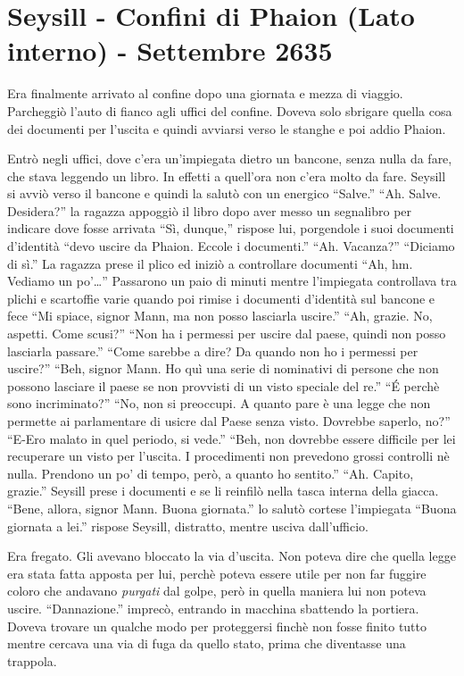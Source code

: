   \section{Seysill - Confini di Phaion (Lato interno) - Settembre 2635}

    Era finalmente arrivato al confine dopo una giornata e mezza di
    viaggio. Parcheggiò l'auto di fianco agli uffici del confine. Doveva
    solo sbrigare quella cosa dei documenti per l'uscita e quindi avviarsi
    verso le stanghe e poi addio Phaion.

    Entrò negli uffici, dove c'era un'impiegata dietro un bancone, senza
    nulla da fare, che stava leggendo un libro. In effetti a quell'ora non
    c'era molto da fare. Seysill si avviò verso il bancone e quindi la
    salutò con un energico ``Salve.'' ``Ah. Salve. Desidera?'' la ragazza
    appoggiò il libro dopo aver messo un segnalibro per indicare dove fosse
    arrivata ``Sì, dunque,'' rispose lui, porgendole i suoi documenti
    d'identità ``devo uscire da Phaion. Eccole i documenti.'' ``Ah.
    Vacanza?'' ``Diciamo di sì.'' La ragazza prese il plico ed iniziò a
    controllare documenti ``Ah, hm. Vediamo un po'\dots{}'' Passarono un
    paio di minuti mentre l'impiegata controllava tra plichi e scartoffie
    varie quando poi rimise i documenti d'identità sul bancone e fece ``Mi
    spiace, signor Mann, ma non posso lasciarla uscire.'' ``Ah, grazie. No,
    aspetti. Come scusi?'' ``Non ha i permessi per uscire dal paese, quindi
    non posso lasciarla passare.'' ``Come sarebbe a dire? Da quando non ho
    i permessi per uscire?'' ``Beh, signor Mann. Ho quì una serie di
    nominativi di persone che non possono lasciare il paese se non
    provvisti di un visto speciale del re.'' ``\'E perchè sono
    incriminato?'' ``No, non si preoccupi. A quanto pare è una legge che
    non permette ai parlamentare di usicre dal Paese senza visto. Dovrebbe
    saperlo, no?'' ``E-Ero malato in quel periodo, si vede.'' ``Beh, non
    dovrebbe essere difficile per lei recuperare un visto per l'uscita. I
    procedimenti non prevedono grossi controlli nè nulla. Prendono un po'
    di tempo, però, a quanto ho sentito.'' ``Ah. Capito, grazie.'' Seysill
    prese i documenti e se li reinfilò nella tasca interna della giacca.
    ``Bene, allora, signor Mann. Buona giornata.'' lo salutò cortese
    l'impiegata ``Buona giornata a lei.'' rispose Seysill, distratto,
    mentre usciva dall'ufficio.

    Era fregato. Gli avevano bloccato la via d'uscita. Non poteva dire che
    quella legge era stata fatta apposta per lui, perchè poteva essere
    utile per non far fuggire coloro che andavano \emph{purgati} dal golpe,
    però in quella maniera lui non poteva uscire. ``Dannazione.'' imprecò,
    entrando in macchina sbattendo la portiera. Doveva trovare un qualche
    modo per proteggersi finchè non fosse finito tutto mentre cercava una
    via di fuga da quello stato, prima che diventasse una trappola.

